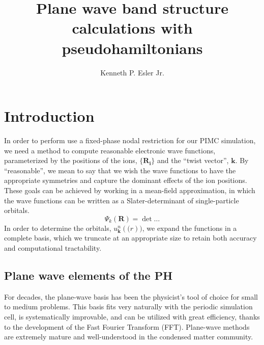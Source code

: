 \documentclass{article}
\title{Plane wave band structure calculations with pseudohamiltonians}
\author{Kenneth P. Esler Jr.}
\begin{document}
\maketitle

\section{Introduction}
In order to perform use a fixed-phase nodal restriction for our PIMC
simulation, we need a method to compute reasonable electronic wave
functions, parameterized by the positions of the ions,
$\{\mathbf{R_i}\}$ and the ``twist vector'', $\mathbf{k}$.  By
``reasonable'', we mean to say that we wish the wave functions to have
the appropriate symmetries and capture the dominant effects of the ion
positions.  These goals can be achieved by working in a mean-field
approximation, in which the wave functions can be written as a
Slater-determinant of single-particle orbitals.
\begin{equation}
\Psi_k(\mathbf{R}) = \det \dots
\end{equation}
In order to determine the orbitals, $u_\mathbf{k}^n(\mathbf(r))$, we
expand the functions in a complete basis, which we truncate at an
appropriate size to retain both accuracy and computational tractability.

\subsection{Plane wave elements of the PH}
For decades, the plane-wave basis has been the physicist's tool of
choice for small to medium problems.  This basis fits very naturally
with the periodic simulation cell, is systematically improvable, and
can be utilized with great efficiency, thanks to the development of
the Fast Fourier Transform (FFT).  Plane-wave methods are extremely
mature and well-understood in the condensed matter community.
\end{document}
